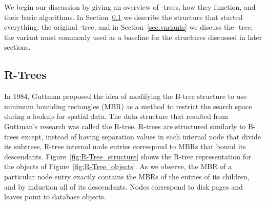 We begin our discussion by giving an overview of \rbase-trees, how they
function, and their basic algorithms. In Section~\ref{sec:rtrees} we describe the
structure that started everything, the original \rbase-tree, 
and in Section~\ref{sec:variants} we discuss the \rstar-tree, the variant most 
commonly used as a baseline for the structures discussed in later sections.

\subsection{R-Trees}
\label{sec:rtrees}
In 1984, Guttman proposed the idea of modifying the B-tree structure to
use minimum bounding rectangles (MBR) as a method to restrict the search space
during a lookup for spatial data\cite{guttman84}. The data structure that 
resulted from Guttman's research was called the R-tree. R-trees are structured
similarly to B-trees except, instead of having separation values in each 
internal node that divide its subtrees, R-tree internal node entries 
correspond to MBRs that bound its descendants. 
Figure~\ref{fig:R-Tree_structure} shows the R-tree representation for the 
objects of Figure~\ref{fig:R-Tree_objects}. As we observe, the MBR of a 
particular node entry exactly contains the MBRs of the entries of its children,
and by induction all of its descendants.
Nodes correspond to disk pages and leaves point to 
database objects.

